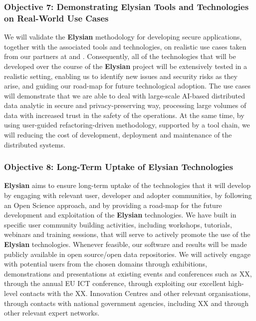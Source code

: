 \documentclass[a4paper,11pt]{article}
\newcommand{\project}[1]{\textbf{#1}\xspace}
\newcommand{\SECURITY}{\project{Elysian}}
\newcommand{\TheProject}{\SECURITY}
\begin{document}
\subsubsection*{Objective 7: Demonstrating \TheProject{} Tools and Technologies on Real-World Use Cases}
\vspace{-6pt}
We will validate the \TheProject{} methodology for developing secure applications, together with the associated tools and technologies, on realistic use cases taken from our partners at \SOPRAshort{} and \FRQshort{}.
Consequently, all of the technologies that will be developed over the course of the \TheProject{} project will be extensively tested in a realistic setting, enabling us to identify new issues and security risks as they arise, and guiding our road-map for future technological adoption. The use cases will demonstrate that we are able to deal with large-scale AI-based distributed data analytic in secure and privacy-preserving way, processing large volumes of data with increased trust in the safety of the operations. At the same time, by using user-guided refactoring-driven methodology, supported by a tool chain, we will reducing the cost of development, deployment and maintenance of the distributed systems.

\subsubsection*{Objective 8: Long-Term Uptake of \TheProject{} Technologies} 
\vspace{-7pt}
\TheProject{} aims to ensure long-term uptake of the technologies that it will develop by engaging with relevant user, developer and adopter communities, by following an Open Science approach, and by providing a road-map for the future development and exploitation of the \TheProject{} technologies. We have built in specific user community building activities, including workshops, tutorials, webinars and training sessions, that will serve to actively promote the use of the \TheProject{} technologies. Whenever feasible, our software and results will be made publicly available in open source/open data repositories. We will actively engage with potential users from the chosen domains through exhibitions, demonstrations and presentations at existing events and conferences such as XX, through the annual EU ICT conference, through exploiting our excellent high-level contacts with the XX. Innovation Centres and other relevant organisations, through contacts with national government agencies, including XX and through other relevant expert networks.
\end{document}
